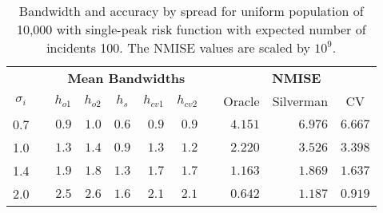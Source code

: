 \begin{table}[htbp]
\begin{center}
\begin{tabular}{lcrrrrrcrrr}
\hline\hline
\multicolumn{1}{c}{\bfseries }&\multicolumn{1}{c}{\bfseries }&\multicolumn{5}{c}{\bfseries Mean Bandwidths}&\multicolumn{1}{c}{\bfseries }&\multicolumn{3}{c}{\bfseries NMISE}\tabularnewline
\cline{3-7} \cline{9-11}
\multicolumn{1}{c}{$\sigma_i$}&\multicolumn{1}{c}{}&\multicolumn{1}{c}{$h_{o1}$}&\multicolumn{1}{c}{$h_{o2}$}&\multicolumn{1}{c}{$h_{s}$}&\multicolumn{1}{c}{$h_{cv1}$}&\multicolumn{1}{c}{$h_{cv2}$}&\multicolumn{1}{c}{}&\multicolumn{1}{c}{Oracle}&\multicolumn{1}{c}{Silverman}&\multicolumn{1}{c}{CV}\tabularnewline
\hline
0.7&&$0.9$&$1.0$&$0.6$&$0.9$&$0.9$&&$4.151$&$6.976$&$6.667$\tabularnewline
1.0&&$1.3$&$1.4$&$0.9$&$1.3$&$1.2$&&$2.220$&$3.526$&$3.398$\tabularnewline
1.4&&$1.9$&$1.8$&$1.3$&$1.7$&$1.7$&&$1.163$&$1.869$&$1.637$\tabularnewline
2.0&&$2.5$&$2.6$&$1.6$&$2.1$&$2.1$&&$0.642$&$1.187$&$0.919$\tabularnewline
\hline
\end{tabular}
\caption[Bandwidth and accuracy by spread of incidents]{Bandwidth and accuracy by spread for uniform population of 10,000 with single-peak risk function with expected number of incidents 100. The NMISE values are scaled by $10^9$.\label{tab:results:bandwidth_vs_spread}}\end{center}
\end{table}
